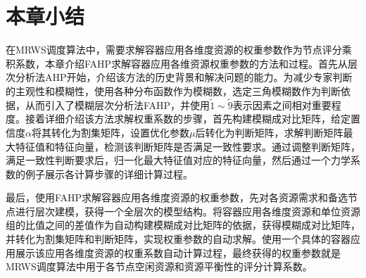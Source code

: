 \section{本章小结}
在MRWS调度算法中，需要求解容器应用各维度资源的权重参数作为节点评分乘积系数，本章介绍FAHP求解容器应用各维资源权重参数的方法和过程。首先从层次分析法AHP开始，介绍该方法的历史背景和解决问题的能力。为减少专家判断的主观性和模糊性，使用各种分布函数作为模糊数，选定三角模糊数作为判断依据，从而引入了模糊层次分析法FAHP，并使用$\widetilde{1}\sim\widetilde{9}$表示因素之间相对重要程度。接着详细介绍该方法求解权重系数的步骤，首先构建模糊成对比矩阵，给定置信度$\alpha$将其转化为割集矩阵，设置优化参数$\mu$后转化为判断矩阵，求解判断矩阵最大特征值和特征向量，检测该判断矩阵是否满足一致性要求。通过调整判断矩阵，满足一致性判断要求后，归一化最大特征值对应的特征向量，然后通过一个力学系数的例子展示各计算步骤的详细计算过程。

最后，使用FAHP求解容器应用各维度资源的权重参数，先对各资源需求和备选节点进行层次建模，获得一个全层次的模型结构。将容器应用各维度资源和单位资源组的比值之间的差值作为自动构建模糊成对比矩阵的依据，获得模糊成对比矩阵，并转化为割集矩阵和判断矩阵，实现权重参数的自动求解。使用一个具体的容器应用展示该应用各维度资源的权重系数自动计算过程，最终获得的权重参数就是MRWS调度算法中用于各节点空闲资源和资源平衡性的评分计算系数。








